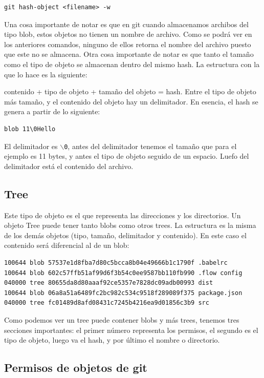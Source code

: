 \begin{verbatim}
git hash-object <filename> -w
\end{verbatim}

Una cosa importante de notar es que en git cuando almacenamos archibos del tipo blob, estos objetos no tienen un nombre de archivo. Como se podrá ver en los anteriores comandos, ninguno de ellos retorna el nombre del archivo puesto que este no se almacena. Otra cosa importante de notar es que tanto el tamaño como el tipo de objeto se almacenan dentro del mismo hash. La estructura con la que lo hace es la siguiente:

contenido + tipo de objeto + tamaño del objeto = hash.  Entre el tipo de objeto más tamaño, y el contenido del objeto hay un delimitador. En esencia, el hash se genera a partir de lo siguiente:

\begin{verbatim}
blob 11\0Hello
\end{verbatim}

El delimitador es \texttt{$\backslash$0}, antes del delimitador tenemos el tamaño que para el ejemplo es 11 bytes, y antes el tipo de objeto seguido de un espacio. Luefo del delimitador está el contenido del archivo. 

\subsection{Tree}

Este tipo de objeto es el que representa las direcciones y los directorios.  Un objeto Tree puede tener tanto blobs como otros trees. La estructura es la misma de los demás objetos (tipo, tamaño, delimitador y contenido). En este caso el contenido será diferencial al de un blob: 

\begin{verbatim}
100644 blob 57537e1d8fba7d80c5bcca8b04e49666b1c1790f .babelrc
100644 blob 602c57ffb51af99d6f3b54c0ee9587bb110fb990 .flow config
040000 tree 80655da8d80aaaf92ce5357e7828dc09adb00993 dist
100644 blob 06a8a51a6489fc2bc982c534c9518f289089f375 package.json
040000 tree fc01489d8afd08431c7245b4216ea9d01856c3b9 src
\end{verbatim}

Como podemos ver un tree puede contener blobs y más trees, tenemos tres secciones importantes: el primer número representa los permisos, el segundo es el tipo de objeto, luego va el hash, y por último el nombre o directorio.

\subsection{Permisos de objetos de git}


